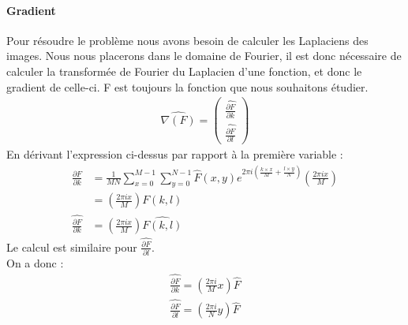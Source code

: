 \paragraph{Gradient}
Pour résoudre le problème nous avons besoin de calculer les Laplaciens des images. Nous nous placerons dans le domaine de Fourier, il est donc nécessaire de calculer la transformée de Fourier du Laplacien d'une fonction, et donc le gradient de celle-ci. 
F est toujours la fonction que nous souhaitons étudier. 
\begin{equation}
\begin{aligned}
\widehat{\nabla (F)}=
\begin{pmatrix}
\widehat{\frac{\partial F}{\partial k}}\\
\widehat{\frac{\partial F}{\partial l}}
\end{pmatrix}
\end{aligned}
\end{equation}
En dérivant l'expression ci-dessus par rapport à la première variable : 
\begin{equation}
\begin{aligned}
\frac{\partial F}{\partial k} &= \frac{1}{MN}\sum_{x = 0}^{M-1} \sum_{y = 0}^{N-1} \widehat{F}(x,y) e^{2\pi i\left(\frac{k\times x}{M}+\frac{l\times y}{N}\right)}\left(\frac{2\pi i x}{M}\right)\\
& = \left(\frac{2\pi i x}{M}\right)F(k,l)\\
\widehat{\frac{\partial F}{\partial k}} &= \left(\frac{2\pi i x}{M}\right)\widehat{F(k,l)}
\end{aligned}
\end{equation}
Le calcul est similaire pour $\widehat{\frac{\partial F}{\partial l}}$.\\
On a donc : 
\begin{equation}
\begin{aligned}
\widehat{\frac{\partial F}{\partial k}} = \left(\frac{2\pi i}{M}x\right) \widehat{F}\\
\widehat{\frac{\partial F}{\partial l}} = \left(\frac{2\pi i}{N}y\right) \widehat{F}\\
\end{aligned}
\end{equation}

